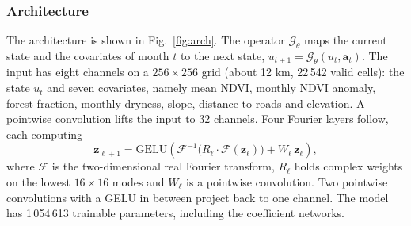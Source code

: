 \documentclass[journal]{IEEEtran}
\begin{document}
\subsubsection{Architecture}
The architecture is shown in Fig.~\ref{fig:arch}. The operator $\mathcal{G}_\theta$ maps the current state and the covariates of month $t$ to the next state, $u_{t+1}=\mathcal{G}_\theta(u_t,\mathbf{a}_t)$. The input has eight channels on a $256\times256$ grid (about 12 km, 22\,542 valid cells): the state $u_t$ and seven covariates, namely mean NDVI, monthly NDVI anomaly, forest fraction, monthly dryness, slope, distance to roads and elevation. A pointwise convolution lifts the input to 32 channels. Four Fourier layers follow, each computing
\begin{equation}
\mathbf{z}_{\ell+1}=\mathrm{GELU}\!\left(\mathcal{F}^{-1}\!\bigl(R_\ell\cdot\mathcal{F}(\mathbf{z}_\ell)\bigr)+W_\ell\,\mathbf{z}_\ell\right),
\label{eq:fourier}
\end{equation}
where $\mathcal{F}$ is the two-dimensional real Fourier transform, $R_\ell$ holds complex weights on the lowest $16\times16$ modes and $W_\ell$ is a pointwise convolution. Two pointwise convolutions with a GELU in between project back to one channel. The model has 1\,054\,613 trainable parameters, including the coefficient networks.
\end{document}
